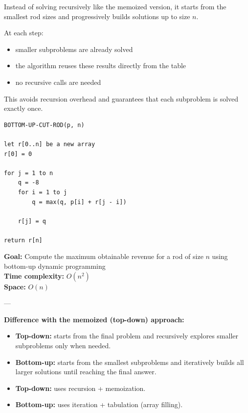 \documentclass[11pt,a4paper,openany]{book}
\begin{document}
Instead of solving recursively like the memoized version, it starts from the smallest rod sizes and progressively builds solutions up to size $n$.

At each step:
\begin{itemize}
    \item smaller subproblems are already solved
    \item the algorithm reuses these results directly from the table
    \item no recursive calls are needed
\end{itemize}

This avoids recursion overhead and guarantees that each subproblem is solved exactly once.

\begin{lstlisting}
BOTTOM-UP-CUT-ROD(p, n)

let r[0..n] be a new array
r[0] = 0

for j = 1 to n
    q = -8
    for i = 1 to j
        q = max(q, p[i] + r[j - i])

    r[j] = q

return r[n]
\end{lstlisting}

\textbf{Goal:} Compute the maximum obtainable revenue for a rod of size $n$ using bottom-up dynamic programming \\

\textbf{Time complexity:} $O(n^2)$ \\

\textbf{Space:} $O(n)$

---

\textbf{Difference with the memoized (top-down) approach:}

\begin{itemize}
    \item \textbf{Top-down:}
    starts from the final problem and recursively explores smaller subproblems only when needed.

    \item \textbf{Bottom-up:}
    starts from the smallest subproblems and iteratively builds all larger solutions until reaching the final answer.

    \item \textbf{Top-down:}
    uses recursion + memoization.

    \item \textbf{Bottom-up:}
    uses iteration + tabulation (array filling).
\end{itemize}
\end{document}
